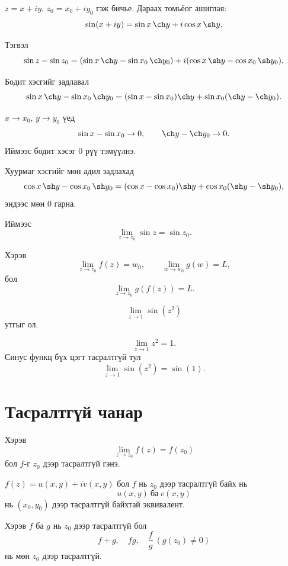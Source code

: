 \begin{sol}
$z=x+iy$, $z_0=x_0+iy_0$ гэж бичье.
Дараах томьёог ашиглая:
\[
\sin(x+iy)=\sin x\,\ch y+i\cos x\,\sh y.
\]

Тэгвэл
\[
\sin z-\sin z_0
=
(\sin x\,\ch y-\sin x_0\,\ch y_0)
+i(\cos x\,\sh y-\cos x_0\,\sh y_0).
\]

Бодит хэсгийг задлавал
\[
\sin x\,\ch y-\sin x_0\,\ch y_0
=
(\sin x-\sin x_0)\ch y
+
\sin x_0(\ch y-\ch y_0).
\]

$x\to x_0$, $y\to y_0$ үед
\[
\sin x-\sin x_0\to 0,\qquad
\ch y-\ch y_0\to 0.
\]
Иймээс бодит хэсэг 0 рүү тэмүүлнэ.

Хуурмаг хэсгийг мөн адил задлахад
\[
\cos x\,\sh y-\cos x_0\,\sh y_0
=
(\cos x-\cos x_0)\sh y
+
\cos x_0(\sh y-\sh y_0),
\]
эндээс мөн 0 гарна.

Иймээс
\[
\lim_{z\to z_0}\sin z=\sin z_0.
\]
\end{sol}
\begin{thm}
Хэрэв
\[
\lim_{z\to z_0} f(z)=w_0,
\qquad
\lim_{w\to w_0} g(w)=L,
\]
бол
\[
\lim_{z\to z_0} g(f(z)) = L.
\]
\end{thm}
\begin{exm}
\[
\lim_{z\to 1} \sin(z^2)
\]
утгыг ол.
\end{exm}

\begin{sol}
\[
\lim_{z\to 1} z^2 = 1.
\]
Синус функц бүх цэгт тасралтгүй тул
\[
\lim_{z\to 1} \sin(z^2)=\sin(1).
\]
\end{sol}


\section{Тасралтгүй чанар}

\begin{dfn}
Хэрэв
\[
\lim_{z\to z_0} f(z)=f(z_0)
\]
бол $f$-г $z_0$ дээр тасралтгүй гэнэ.
\end{dfn}

\begin{thm}
$f(z)=u(x,y)+iv(x,y)$ бол $f$ нь $z_0$ дээр тасралтгүй байх нь
\[
u(x,y)\ \text{ба}\ v(x,y)
\]
нь $(x_0,y_0)$ дээр тасралтгүй байхтай эквивалент.
\end{thm}

\begin{thm}
Хэрэв $f$ ба $g$ нь $z_0$ дээр тасралтгүй бол
\[
f+g,\quad fg,\quad \frac{f}{g}\ (g(z_0)\neq 0)
\]
нь мөн $z_0$ дээр тасралтгүй.
\end{thm}

